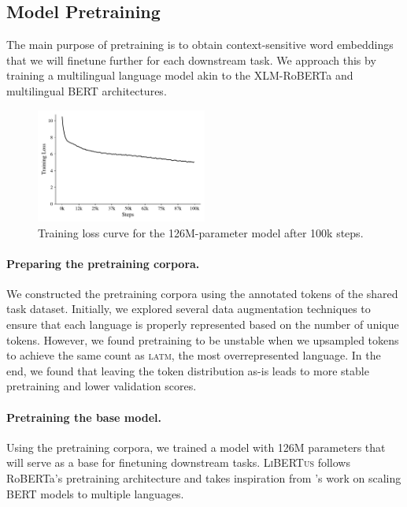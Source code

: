 \documentclass[11pt]{article}
\newcommand{\libertus}{\textsc{LiBERTus}}
\begin{document}

\subsection{Model Pretraining}

The main purpose of pretraining is to obtain context-sensitive word embeddings that we will finetune further for each downstream task.
We approach this by training a multilingual language model akin to the XLM-RoBERTa \cite{conneau-etal-2020-unsupervised} and multilingual BERT \cite{devlin-etal-2019-bert} architectures.

\begin{figure}[t]
\centering
\includegraphics[width=0.5\textwidth]{figures/train_loss.pdf}
\caption{Training loss curve for the 126M-parameter model after 100k steps.}
\label{fig:training_curve}
\end{figure}

\paragraph{Preparing the pretraining corpora.} 
We constructed the pretraining corpora using the annotated tokens of the shared task dataset.
Initially, we explored several data augmentation techniques to ensure that each language is properly represented based on the number of unique tokens.
However, we found pretraining to be unstable when we upsampled tokens to achieve the same count as \textsc{latm}, the most overrepresented language.
In the end, we found that leaving the token distribution as-is leads to more stable pretraining and lower validation scores.

\paragraph{Pretraining the base model.} 
Using the pretraining corpora, we trained a model with 126M parameters that will serve as a base for finetuning downstream tasks.
\libertus{} follows RoBERTa's pretraining architecture \cite{liu-etal-2019-roberta} and takes inspiration from \citet{conneau-etal-2020-unsupervised}'s work on scaling BERT models to multiple languages.
\end{document}
